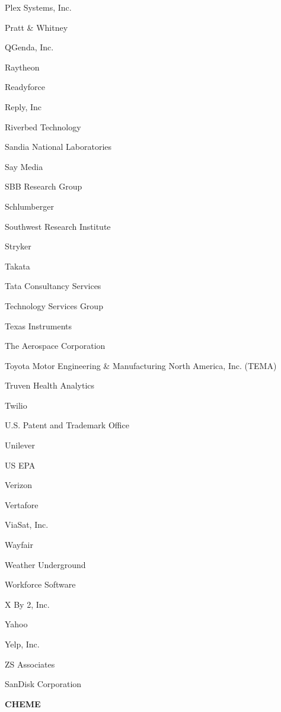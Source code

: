 \documentclass[twoside]{article}
\begin{document}
\begin{center}
\begin{multicols}{5}
\begin{FlushLeft}
\begin{compactitem}
\item Plex Systems, Inc.
\item Pratt \& Whitney
\item QGenda, Inc.
\item Raytheon
\item Readyforce
\item Reply, Inc
\item Riverbed Technology
\item Sandia National Laboratories
\item Say Media
\item SBB Research Group
\item Schlumberger
\item Southwest Research Institute
\item Stryker
\item Takata
\item Tata Consultancy Services
\item Technology Services Group
\item Texas Instruments
\item The Aerospace Corporation
\item Toyota Motor Engineering \& Manufacturing North America, Inc. (TEMA)
\item Truven Health Analytics
\item Twilio
\item U.S. Patent and Trademark Office
\item Unilever
\item US EPA
\item Verizon
\item Vertafore
\item ViaSat, Inc.
\item Wayfair
\item Weather Underground
\item Workforce Software
\item X By 2, Inc.
\item Yahoo
\item Yelp, Inc.
\item ZS Associates
\item SanDisk Corporation
\end{compactitem}
        \end{FlushLeft}
        \vspace{1em}
        {\fontsize{14}{16}\selectfont \bf CHEME}\\
        \vspace{-1em}
        ~\hrulefill~
        \vspace{-.9em}

\end{multicols}
\end{center}
\end{document}
